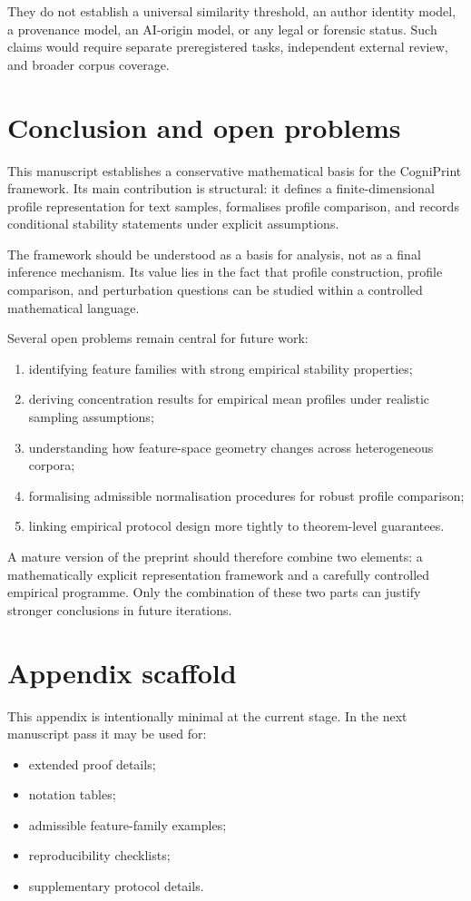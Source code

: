 \documentclass[11pt]{article}
\begin{document}
They do not establish a universal similarity threshold, an author identity model, a provenance model, an AI-origin model, or any legal or forensic status. Such claims would require separate preregistered tasks, independent external review, and broader corpus coverage.

\section{Conclusion and open problems}

This manuscript establishes a conservative mathematical basis for the CogniPrint framework. Its main contribution is structural: it defines a finite-dimensional profile representation for text samples, formalises profile comparison, and records conditional stability statements under explicit assumptions.

The framework should be understood as a basis for analysis, not as a final inference mechanism. Its value lies in the fact that profile construction, profile comparison, and perturbation questions can be studied within a controlled mathematical language.

Several open problems remain central for future work:
\begin{enumerate}[label=\arabic*.]
    \item identifying feature families with strong empirical stability properties;
    \item deriving concentration results for empirical mean profiles under realistic sampling assumptions;
    \item understanding how feature-space geometry changes across heterogeneous corpora;
    \item formalising admissible normalisation procedures for robust profile comparison;
    \item linking empirical protocol design more tightly to theorem-level guarantees.
\end{enumerate}

A mature version of the preprint should therefore combine two elements: a mathematically explicit representation framework and a carefully controlled empirical programme. Only the combination of these two parts can justify stronger conclusions in future iterations.

\appendix

\section{Appendix scaffold}

This appendix is intentionally minimal at the current stage. In the next manuscript pass it may be used for:
\begin{itemize}
    \item extended proof details;
    \item notation tables;
    \item admissible feature-family examples;
    \item reproducibility checklists;
    \item supplementary protocol details.
\end{itemize}



\end{document}
